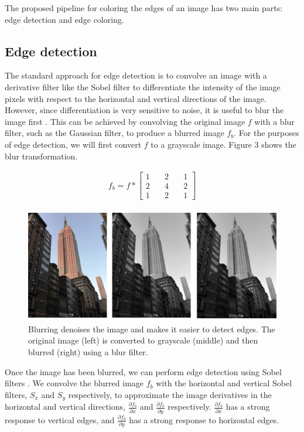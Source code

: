\documentclass[runningheads]{llncs}
\begin{document}
The proposed pipeline for coloring the edges of an image has two main parts: edge detection and edge coloring.

\subsection{Edge detection}

The standard approach for edge detection is to convolve an image with a derivative filter like the Sobel filter to differentiate the intensity of the image pixels with respect to the horizontal and vertical directions of the image. However, since differentiation is very sensitive to noise, it is useful to blur the image first \cite{filtering_lecture}. This can be achieved by convolving the original image $f$ with a blur filter, such as the Gaussian filter, to produce a blurred image $f_b$. For the purposes of edge detection, we will first convert $f$ to a grayscale image. Figure 3 shows the blur transformation.

\begin{align}
f_b = f * \begin{bmatrix} 
1 & \quad 2 & \quad 1 \\ 
2 & \quad 4 & \quad 2 \\ 
1 & \quad 2 & \quad 1  
\end{bmatrix}
\end{align}

\begin{figure}
\centering
\includegraphics[height=5cm]{images/blur.png}
\caption{Blurring denoises the image and makes it easier to detect edges. The original image (left) is converted to grayscale (middle) and then blurred (right) using a blur filter.}
\label{fig:example}
\end{figure}

Once the image has been blurred, we can perform edge detection using Sobel filters \cite{sobel}. We convolve the blurred image $f_b$ with the horizontal and vertical Sobel filters, $S_x$ and $S_y$ respectively, to approximate the image derivatives in the horizontal and vertical directions, $\frac{\partial f_b}{\partial x}$ and $\frac{\partial f_b}{\partial y}$ respectively. $\frac{\partial f_b}{\partial x}$ has a strong response to vertical edges, and $\frac{\partial f_b}{\partial y}$ has a strong response to horizontal edges.
\end{document}

